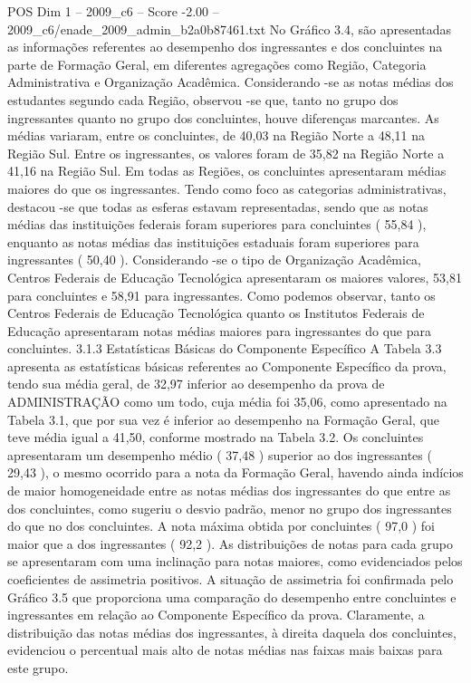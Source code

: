 \begin{textsample}{POS Dim 1 – 2009\_c6 – Score -2.00 – 2009\_c6/enade\_2009\_admin\_b2a0b87461.txt}
No Gráfico 3.4, são apresentadas as informações referentes ao desempenho dos ingressantes e dos concluintes na parte de Formação Geral, em diferentes agregações como Região, Categoria Administrativa e Organização Acadêmica.
Considerando -se as notas médias dos estudantes segundo cada Região, observou -se que, tanto no grupo dos ingressantes quanto no grupo dos concluintes, houve diferenças marcantes.
As médias variaram, entre os concluintes, de 40,03 na Região Norte a 48,11 na Região Sul.
Entre os ingressantes, os valores foram de 35,82 na Região Norte a 41,16 na Região Sul.
Em todas as Regiões, os concluintes apresentaram médias maiores do que os ingressantes.
Tendo como foco as categorias administrativas, destacou -se que todas as esferas estavam representadas, sendo que as notas médias das instituições federais foram superiores para concluintes ( 55,84 ), enquanto as notas médias das instituições estaduais foram superiores para ingressantes ( 50,40 ).
Considerando -se o tipo de Organização Acadêmica, Centros Federais de Educação Tecnológica apresentaram os maiores valores, 53,81 para concluintes e 58,91 para ingressantes.
Como podemos observar, tanto os Centros Federais de Educação Tecnológica quanto os Institutos Federais de Educação apresentaram notas médias maiores para ingressantes do que para concluintes. 3.1.3 Estatísticas Básicas do Componente Específico A Tabela 3.3 apresenta as estatísticas básicas referentes ao Componente Específico da prova, tendo sua média geral, de 32,97 inferior ao desempenho da prova de ADMINISTRAÇÃO como um todo, cuja média foi 35,06, como apresentado na Tabela 3.1, que por sua vez é inferior ao desempenho na Formação Geral, que teve média igual a 41,50, conforme mostrado na Tabela 3.2.
Os concluintes apresentaram um desempenho médio ( 37,48 ) superior ao dos ingressantes ( 29,43 ), o mesmo ocorrido para a nota da Formação Geral, havendo ainda indícios de maior homogeneidade entre as notas médias dos ingressantes do que entre as dos concluintes, como sugeriu o desvio padrão, menor no grupo dos ingressantes do que no dos concluintes.
A nota máxima obtida por concluintes ( 97,0 ) foi maior que a dos ingressantes ( 92,2 ).
As distribuições de notas para cada grupo se apresentaram com uma inclinação para notas maiores, como evidenciados pelos coeficientes de assimetria positivos.
A situação de assimetria foi confirmada pelo Gráfico 3.5 que proporciona uma comparação do desempenho entre concluintes e ingressantes em relação ao Componente Específico da prova.
Claramente, a distribuição das notas médias dos ingressantes, à direita daquela dos concluintes, evidenciou o percentual mais alto de notas médias nas faixas mais baixas para este grupo.

\end{textsample}
